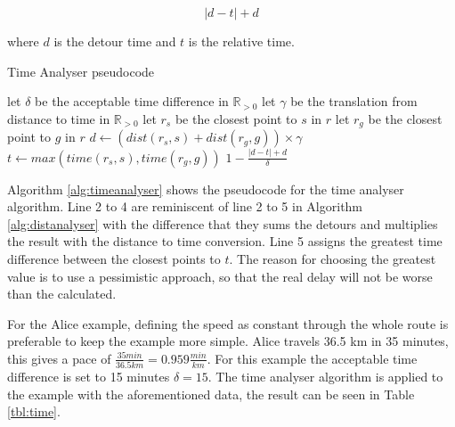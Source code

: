 \[ |d - t| + d \]

where $d$ is the detour time and $t$ is the relative time.

\begin{algorithm}
	\caption{Time Analyser pseudocode}
	\label{alg:timeanalyser}
	\begin{algorithmic}[1]
		\Require 
		\Statex let $\delta$ be the acceptable time difference in $\mathbb{R}_{>0}$
		\Statex let $\gamma$ be the translation from distance to time in $\mathbb{R}_{>0}$ 
		\Statex 
			\State let $r_s$ be the closest point to $s$ in $r$
			\State let $r_g$ be the closest point to $g$ in $r$
			\State $d \gets (dist(r_s,s) + dist(r_g,g))\times\gamma$
			\State $t \gets max(time(r_s, s), time(r_g, g))$
			\State\Return $1-\frac{|d - t| + d}{\delta}$
		\EndFunction
	\end{algorithmic}
\end{algorithm}

Algorithm \ref{alg:timeanalyser} shows the pseudocode for the time analyser algorithm.
Line 2 to 4 are reminiscent of line 2 to 5 in Algorithm \ref{alg:distanalyser} with the difference that they sums the detours and multiplies the result with the distance to time conversion.
Line 5 assigns the greatest time difference between the closest points to $t$.
The reason for choosing the greatest value is to use a pessimistic approach, so that the real delay will not be worse than the calculated.

For the Alice example, defining the speed as constant through the whole route is preferable to keep the example more simple.
Alice travels 36.5 km in 35 minutes, this gives a pace of  $\frac{35 min}{36.5 km} = 0.959\frac{min}{km} $.
For this example the acceptable time difference is set to 15 minutes $\delta = 15$.
The time analyser algorithm is applied to the example with the aforementioned data, the result can be seen in Table \ref{tbl:time}.

